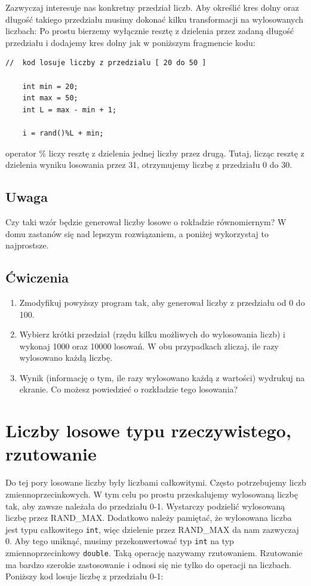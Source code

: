 \documentclass{instrukcja}
\begin{document}
Zazwyczaj interesuje nas konkretny przedział liczb. Aby określić kres dolny oraz długość takiego przedziału musimy dokonać kilku transformacji na wylosowanych liczbach:\newline
Po prostu bierzemy  wyłącznie resztę z dzielenia przez zadaną długość przedziału i dodajemy kres dolny jak w poniższym fragmencie kodu:

\begin{verbatim}
//  kod losuje liczby z przedzialu [ 20 do 50 ]
	
	int min = 20;
	int max = 50;
	int L = max - min + 1;

	i = rand()%L + min;
\end{verbatim}

operator \% liczy resztę z dzielenia jednej liczby przez drugą. Tutaj, licząc resztę z dzielenia wyniku losowania przez 31,  otrzymujemy liczbę z przedziału 0 do 30.\newline 
\subsection*{Uwaga}
Czy taki wzór będzie generował liczby losowe o rokładzie równomiernym? W domu zastanów się nad lepszym rozwiązaniem, a poniżej wykorzystaj to najprostsze.
\subsection*{Ćwiczenia}
\begin{enumerate}
\item Zmodyfikuj powyższy program tak, aby generował liczby z przedziału od 0 do 100.
\item Wybierz krótki przedział (rzędu kilku możliwych do wylosowania liczb) i wykonaj 1000 oraz 10000 losowań. W obu przypadkach zliczaj, ile razy wylosowano każdą liczbę.
\item Wynik (informację o tym, ile razy wylosowano każdą z wartości) wydrukuj na ekranie. Co możesz powiedzieć o rozkładzie tego losowania?
\end{enumerate}

\section*{Liczby losowe typu rzeczywistego, rzutowanie}
Do tej pory losowane liczby były liczbami całkowitymi. Często potrzebujemy liczb zmiennoprzecinkowych. W tym celu po prostu przeskalujemy wylosowaną liczbę tak, aby zawsze należała do przedziału 0-1. Wystarczy podzielić wylosowaną liczbę przez RAND\_MAX. Dodatkowo należy pamiętać, że wylosowana liczba jest typu całkowitego {\tt int}, więc dzielenie przez RAND\_MAX da nam zazwyczaj 0. Aby tego uniknąć, musimy przekonwertować typ {\tt int} na typ zmiennoprzecinkowy 
{\tt double}. Taką operację nazywamy rzutowaniem. Rzutowanie ma bardzo szerokie zastosowanie i odnosi się nie tylko do operacji na liczbach.
Poniższy kod losuje liczbę z przedziału 0-1:
\end{document}

